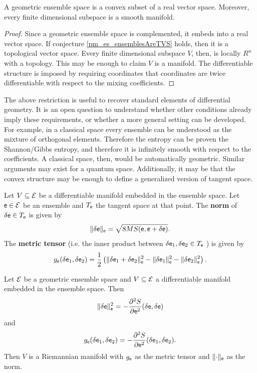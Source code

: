 \begin{conj}
	A geometric ensemble space is a convex subset of a real vector space. Moreover, every finite dimensional subspace is a smooth manifold.
\end{conj}

\begin{proof}
	Since a geometric ensemble space is complemented, it embeds into a real vector space. If conjecture \ref{pm_es_ensemblesAreTVS} holds, then it is a topological vector space. Every finite dimensional subspace $V$, then, is locally $R^n$ with a topology. This may be enough to claim $V$ is a manifold. The differentiable structure is imposed by requiring coordinates that coordinates are twice differentiable with respect to the mixing coefficients.
\end{proof}

\begin{remark}
	The above restriction is useful to recover standard elements of differential geometry. It is an open question to understand whether other conditions already imply these requirements, or whether a more general setting can be developed. For example, in a classical space every ensemble can be understood as the mixture of orthogonal elements. Therefore the entropy can be proven the Shannon/Gibbs entropy, and therefore it is infinitely smooth with respect to the coefficients. A classical space, then, would be automatically geometric. Similar arguments may exist for a quantum space. Additionally, it may be that the convex structure may be enough to define a generalized version of tangent space.
\end{remark}

\begin{defn}
	Let $V \subseteq \mathcal{E}$ be a differentiable manifold embedded in the ensemble space. Let $\mathsf{e} \in \mathcal{E}$ be an ensemble and $T_{\mathsf{e}}$ the tangent space at that point. The \textbf{norm} of $\delta \mathsf{e} \in T_{\mathsf{e}}$ is given by
	$$ \lVert \delta \mathsf{e} \rVert_{\mathsf{e}} = \sqrt{ 8 MS(\mathsf{e}, \mathsf{e} + \delta \mathsf{e}) }.$$
	The \textbf{metric tensor} (i.e. the inner product between $\delta \mathsf{e}_1 , \delta \mathsf{e}_2 \in T_{\mathsf{e}}$ ) is given by
	$$ g_{\mathsf{e}}( \delta \mathsf{e}_1, \delta \mathsf{e}_2 ) = \frac{1}{2} \left( \lVert \delta \mathsf{e}_1 + \delta \mathsf{e}_2 \rVert_{\mathsf{e}}^2 - \lVert \delta \mathsf{e}_1 \rVert_{\mathsf{e}}^2 - \lVert \delta \mathsf{e}_2 \rVert_{\mathsf{e}}^2 \right).$$
\end{defn}

\begin{thrm}
	Let $\mathcal{E}$ be a geometric ensemble space and $V \subseteq \mathcal{E}$ a differentiable manifold embedded in the ensemble space. Then
	$$ \lVert \delta \mathsf{e} \rVert_{\mathsf{e}}^2 = - \frac{\partial^2 S}{\partial \mathsf{e}^2}(\delta \mathsf{e} , \delta \mathsf{e}) $$
	and 
	$$ g_{\mathsf{e}}( \delta \mathsf{e}_1, \delta \mathsf{e}_2 ) = - \frac{\partial^2 S}{\partial \mathsf{e} ^2}( \delta \mathsf{e}_1, \delta \mathsf{e}_2 ).$$
	Then $V$ is a Riemannian manifold with $g_{\mathsf{e}}$ as the metric tensor and $\lVert \cdot \rVert_{\mathsf{e}}$ as the norm.
\end{thrm}

